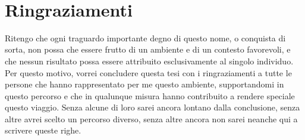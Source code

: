 \documentclass[
    blacklinks,
    libertine,
]{uninathesis}
\theoremstyle{plain}
\theoremstyle{definition}
\theoremstyle{remark}
\begin{document}
    \pagestyle{empty}
    \frontmatter
    \makefrontespizio~\clearpage
    \makefrontespizioalt~\clearpage

    \pagestyle{backmatter}
    
    
    \clearpage
    \tableofcontents

    \mainmatter{}

    

    \newpage\pagestyle{main}

    

    

    

    

    

    

    


    

    
    
    \newpage
    \pagestyle{backmatter}
    \printbibliography[heading=bibintoc]
    

    \listoffigures
    \listofalgorithms

    \newpage\pagestyle{conclusions}

    \chapter*{Ringraziamenti}

    Ritengo che ogni traguardo importante degno di questo nome, o conquista di sorta, non possa che essere frutto di un ambiente e di un contesto favorevoli, e che nessun risultato possa essere attribuito esclusivamente al singolo individuo.
    Per questo motivo, vorrei concludere questa tesi con i ringraziamenti a tutte le persone che hanno rappresentato per me questo ambiente, supportandomi in questo percorso e che in qualunque misura hanno contribuito a rendere speciale questo viaggio.
    Senza alcune di loro sarei ancora lontano dalla conclusione, senza altre avrei scelto un percorso diverso, senza altre ancora non sarei neanche qui a scrivere queste righe.
\end{document}
